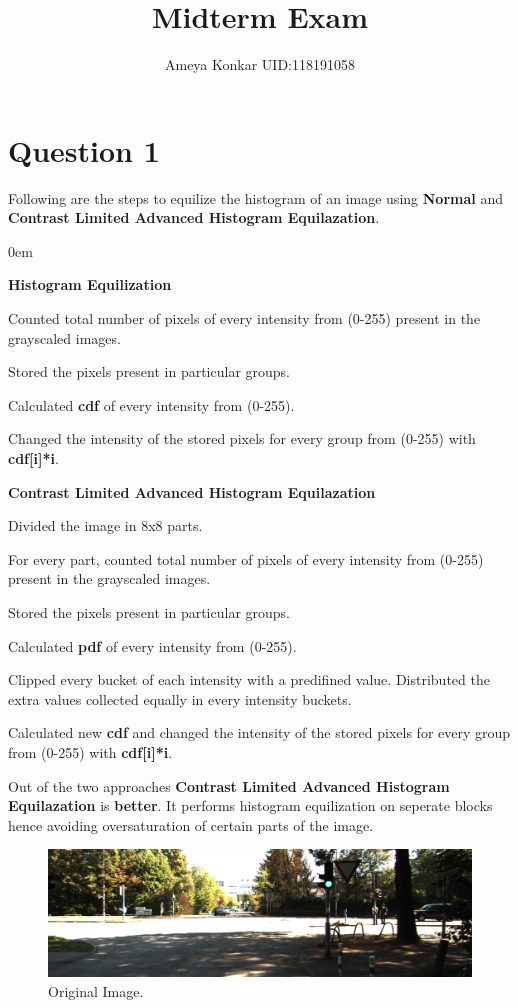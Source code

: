 \documentclass[11pt]{article}
\title{\textbf{Midterm Exam}}
\author{Ameya Konkar  UID:118191058}
\date{}
\begin{document}
\maketitle
\thispagestyle{empty}

\section{Question 1}
Following are the steps to equilize the histogram of an image using \textbf{Normal} and \textbf{Contrast Limited Advanced Histogram Equilazation}.

\begin{description}
\addtolength{\itemindent}{0.80cm}
\itemsep0em 
\item[a)] \textbf{Histogram Equilization}
\item[1.] Counted total number of pixels of every intensity from (0-255) present in the grayscaled images. 
\item[2.] Stored the pixels present in particular groups.
\item[3.] Calculated \textbf{cdf} of every intensity from (0-255).
\item[4.] Changed the intensity of the stored pixels for every group from (0-255) with \textbf{cdf[i]*i}.
\newline
\item[b)] \textbf{Contrast Limited Advanced Histogram Equilazation}
\item[1.] Divided the image in 8x8 parts.
\item[2.] For every part, counted total number of pixels of every intensity from (0-255) present in the grayscaled images. 
\item[3.] Stored the pixels present in particular groups.
\item[4.] Calculated \textbf{pdf} of every intensity from (0-255).
\item[5.] Clipped every bucket of each intensity with a predifined value. Distributed the extra values collected equally in every intensity buckets.
\item[5.] Calculated new \textbf{cdf} and changed the intensity of the stored pixels for every group from (0-255) with \textbf{cdf[i]*i}.

Out of the two approaches \textbf{Contrast Limited Advanced Histogram Equilazation} is \textbf{better}. It performs histogram equilization on seperate blocks hence avoiding oversaturation of certain parts of the image. 

\begin{figure}[H]
  \centering
	\includegraphics[width=1\textwidth]{orig_img}
	\caption{Original Image.} 
\end{figure}


\end{description}
\end{document}
